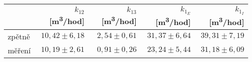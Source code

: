 \begin{tabular}{lrrrr}
\toprule
{} & $k_{12}$ [\si{m^3/hod}] & $k_{13}$ [\si{m^3/hod}] & $k_{1_E}$ [\si{m^3/hod}] & $k_{1_I}$ [\si{m^3/hod}] \\
\midrule
zpětně &            $10,42\pm6,18$ &             $2,54\pm0,61 $&            $31,37\pm6,64 $&            $39,31\pm7,19 $\\
měření &            $10,19\pm2,61$ &             $0,91\pm0,26 $&            $23,24\pm5,44 $&            $31,18\pm6,09 $\\
\bottomrule
\end{tabular}

